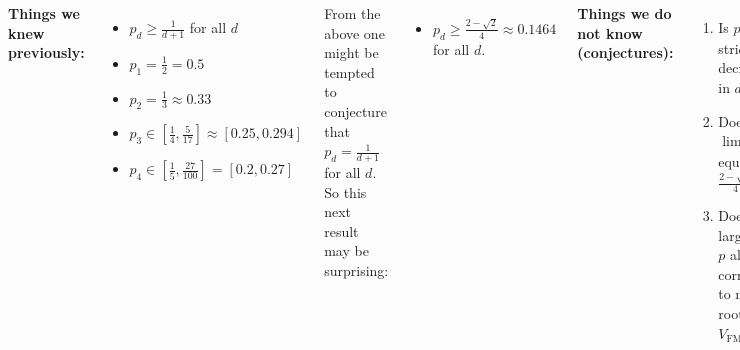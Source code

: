 \documentclass[25pt,margin=1in,innermargin=-7in,blockverticalspace=0in]{tikzposter}
\newcommand{\edit}[1]{\textcolor{red}{#1}}
\newcommand{\FM}{\operatorname{FM}}
\begin{document}
\begin{columns}
{        %

        \textbf{Things we knew previously:} \begin{itemize}
        \item $p_d \geq \frac{1}{d+1}$ for all $d$
         \item $p_1 = \frac{1}{2} = 0.5$
         \item $p_2 = \frac{1}{3} \approx 0.33$ \hfill \cite{hoffman2017recurrence}
         \item $p_3 \in [\frac{1}{4}, \frac{5}{17}] \approx [0.25, 0.294]$ \hfill \cite{bailey2023critical}
         \item $p_4 \in [\frac{1}{5}, \frac{27}{100}] = [0.2, 0.27]$ \hfill \cite{bailey2023critical}
    \end{itemize}
    From the above one might be tempted to conjecture that $p_d = \frac{1}{d+1}$ for all $d$. So this next result may be surprising: %
    \begin{itemize}
         \item $p_d \geq \frac{2-\sqrt{2}}{4} \approx 0.1464$ for all $d$. \hfill \cite{beckman2019frog}
     \end{itemize}
    
    \textbf{Things we do not know (conjectures):}
        \begin{enumerate}
             \item Is $p_d$ strictly decreasing in $d$?
             \item Does $\lim_{d\to\infty } p_d$ equal $ \frac{2-\sqrt{2}}{4}$?
             \item Does a larger $d$ or $p$ always correspond to more root visits $V_{\FM}$?
        \end{enumerate}

}
\end{columns}
\end{document}
